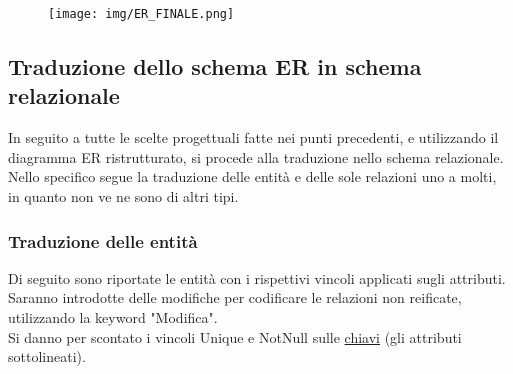 \documentclass{article}
\begin{document}
\begin{figure}[h]
    \centering
    \texttt{[image: img/ER\_FINALE.png]}
    \label{fig:ER_Schema}
\end{figure}

\subsection{Traduzione dello schema ER in schema relazionale}

In seguito a tutte le scelte progettuali fatte nei punti precedenti, e utilizzando il diagramma ER ristrutturato, si procede alla traduzione nello schema relazionale.
Nello specifico segue la traduzione delle entità e delle sole relazioni uno a molti, in quanto non ve ne sono di altri tipi.

\subsubsection{Traduzione delle entità}
Di seguito sono riportate le entità con i rispettivi vincoli applicati sugli attributi. 
Saranno introdotte delle modifiche per codificare le relazioni non reificate, utilizzando la keyword "Modifica". 
\\Si danno per scontato i vincoli Unique e NotNull sulle \underline{chiavi} (gli attributi sottolineati).
\end{document}
